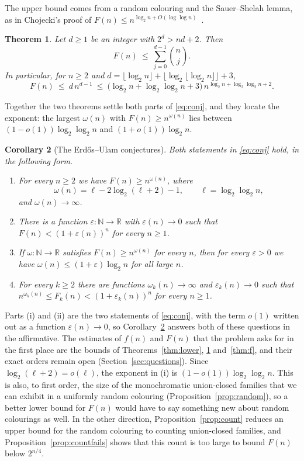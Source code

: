 \documentclass[11pt,reqno]{amsart}
\numberwithin{equation}{section}
\theoremstyle{plain}
\newtheorem{theorem}{Theorem}[section]
\newtheorem{corollary}[theorem]{Corollary}
\theoremstyle{definition}
\theoremstyle{remark}
\newcommand{\eps}{\varepsilon}
\begin{document}
The upper bound comes from a random colouring and the Sauer--Shelah
lemma, as in Chojecki's proof of
$F(n)\le n^{\log_2n+O(\log\log n)}$~\cite{Ch26}.

\begin{theorem}
\label{thm:upper}
Let $d\ge1$ be an integer with $2^{d}>nd+2$. Then
\[
F(n)\ \le\ \sum_{j=0}^{d-1}\binom{n}{j}.
\]
In particular, for $n\ge2$ and
$d=\lfloor\log_2n\rfloor+\lfloor\log_2\lfloor\log_2n\rfloor\rfloor+3$,
\[
F(n)\ \le\ d\,n^{d-1}\ \le\ \bigl(\log_2n+\log_2\log_2n+3\bigr)\,
n^{\log_2n+\log_2\log_2n+2}.
\]
\end{theorem}

Together the two theorems settle both parts of \eqref{eq:conj}, and they
locate the exponent: the largest $\omega(n)$ with $F(n)\ge n^{\omega(n)}$
lies between $(1-o(1))\log_2\log_2n$ and $(1+o(1))\log_2n$.

\begin{corollary}[The Erd\H{o}s--Ulam conjectures]
\label{cor:conj}
Both statements in \eqref{eq:conj} hold, in the following form.
\begin{enumerate}[label=\textup{(\roman*)},leftmargin=2em]
\item For every $n\ge2$ we have $F(n)\ge n^{\omega(n)}$, where
\[
\omega(n)=\ell-2\log_2(\ell+2)-1,\qquad \ell=\log_2\log_2n ,
\]
and $\omega(n)\to\infty$.
\item There is a function $\eps:\mathbb{N}\to\mathbb{R}$ with
$\eps(n)\to0$ such that $F(n)<(1+\eps(n))^{n}$ for every $n\ge1$.
\item If $\omega:\mathbb{N}\to\mathbb{R}$ satisfies $F(n)\ge
n^{\omega(n)}$ for every $n$, then for every $\eps>0$ we have
$\omega(n)\le(1+\eps)\log_2n$ for all large $n$.
\item For every $k\ge2$ there are functions $\omega_k(n)\to\infty$ and
$\eps_k(n)\to0$ such that $n^{\omega_k(n)}\le F_k(n)<(1+\eps_k(n))^{n}$
for every $n\ge1$.
\end{enumerate}
\end{corollary}

Parts (i) and (ii) are the two statements of \eqref{eq:conj}, with the
term $o(1)$ written out as a function $\eps(n)\to0$, so
Corollary~\ref{cor:conj} answers both of these questions in the
affirmative. The estimates of $f(n)$ and $F(n)$ that the problem asks for
in the first place are the bounds of Theorems~\ref{thm:lower},
\ref{thm:upper} and~\ref{thm:f}, and their exact orders remain open
(Section~\ref{sec:questions}). Since $\log_2(\ell+2)=o(\ell)$, the
exponent in (i) is $(1-o(1))\log_2\log_2n$. This is also, to first order, the size of the
monochromatic union-closed families that we can exhibit in a uniformly
random colouring (Proposition~\ref{prop:random}), so a better lower bound
for $F(n)$ would have to say something new about random colourings as
well. In the other direction, Proposition~\ref{prop:count} reduces an
upper bound for the random colouring to counting union-closed families,
and Proposition~\ref{prop:countfails} shows that this count is too large
to bound $F(n)$ below $2^{n/4}$.
\end{document}
